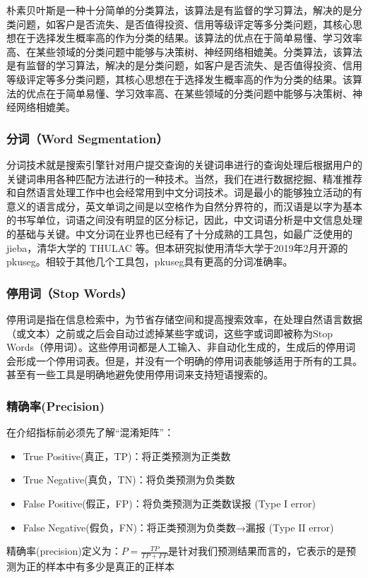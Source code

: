 \documentclass[UTF8]{ctexart}
\begin{document}
朴素贝叶斯是一种十分简单的分类算法，该算法是有监督的学习算法，解决的是分类问题，如客户是否流失、是否值得投资、信用等级评定等多分类问题，其核心思想在于选择发生概率高的作为分类的结果。该算法的优点在于简单易懂、学习效率高、在某些领域的分类问题中能够与决策树、神经网络相媲美。分类算法，该算法是有监督的学习算法，解决的是分类问题，如客户是否流失、是否值得投资、信用等级评定等多分类问题，其核心思想在于选择发生概率高的作为分类的结果。该算法的优点在于简单易懂、学习效率高、在某些领域的分类问题中能够与决策树、神经网络相媲美。
\subsubsection{分词（Word Segmentation）}
分词技术就是搜索引擎针对用户提交查询的关键词串进行的查询处理后根据用户的关键词串用各种匹配方法进行的一种技术。当然，我们在进行数据挖掘、精准推荐和自然语言处理工作中也会经常用到中文分词技术。词是最小的能够独立活动的有意义的语言成分，英文单词之间是以空格作为自然分界符的，而汉语是以字为基本的书写单位，词语之间没有明显的区分标记，因此，中文词语分析是中文信息处理的基础与关键。中文分词在业界也已经有了十分成熟的工具包，如最广泛使用的 jieba，清华大学的 THULAC 等。但本研究拟使用清华大学于2019年2月开源的pkuseg。相较于其他几个工具包，pkuseg具有更高的分词准确率。
\subsubsection{停用词（Stop Words）}
停用词是指在信息检索中，为节省存储空间和提高搜索效率，在处理自然语言数据（或文本）之前或之后会自动过滤掉某些字或词，这些字或词即被称为Stop Words（停用词）。这些停用词都是人工输入、非自动化生成的，生成后的停用词会形成一个停用词表。但是，并没有一个明确的停用词表能够适用于所有的工具。甚至有一些工具是明确地避免使用停用词来支持短语搜索的。
\subsubsection{精确率(Precision)}
在介绍指标前必须先了解“混淆矩阵”：
\begin{itemize}
	\item True Positive(真正，TP)：将正类预测为正类数
	\item True Negative(真负，TN)：将负类预测为负类数
	\item False Positive(假正，FP)：将负类预测为正类数误报 (Type I error)
	\item False Negative(假负，FN)：将正类预测为负类数→漏报 (Type II error)
\end{itemize}
精确率(precision)定义为：$P=\frac{T P}{T P+F P}$是针对我们预测结果而言的，它表示的是预测为正的样本中有多少是真正的正样本
\end{document}
